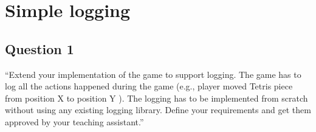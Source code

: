 \chapter{Simple logging}

\section{Question 1}

``Extend your implementation of the game to support logging. The game has to log all the actions
happened during the game (e.g., player moved Tetris piece from position X to position Y ). The
logging has to be implemented from scratch without using any existing logging library. Define your
requirements and get them approved by your teaching assistant.''
